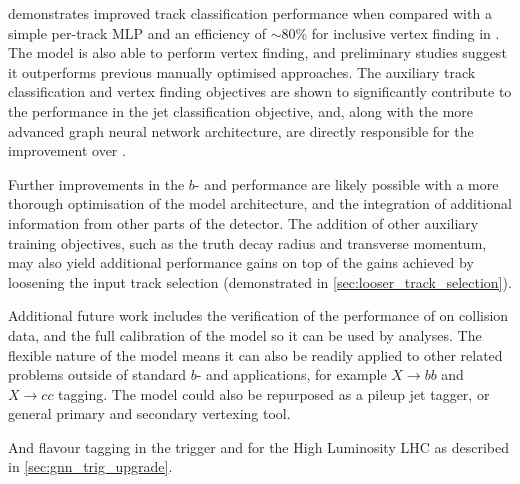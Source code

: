 \GNN demonstrates improved track classification performance when compared with a simple per-track MLP and an efficiency of $\sim80\%$ for inclusive vertex finding in \bjets.
The model is also able to perform vertex finding, and preliminary studies suggest it outperforms previous manually optimised approaches.
The auxiliary track classification and vertex finding objectives are shown to significantly contribute to the performance in the jet classification objective, and, along with the more advanced graph neural network architecture, are directly responsible for the improvement over \DLr.

Further improvements in the $b$- and \ctagging performance are likely possible with a more thorough optimisation of the model architecture, and the integration of additional information from other parts of the \ATLAS detector.
The addition of other auxiliary training objectives, such as the truth \bhadron decay radius and transverse momentum, may also yield additional performance gains on top of the gains achieved by loosening the input track selection (demonstrated in \cref{sec:looser_track_selection}).

Additional future work includes the verification of the performance of \GNN on collision data, and the full calibration of the model so it can be used by analyses.
The flexible nature of the model means it can also be readily applied to other related problems outside of standard $b$- and \ctagging applications, for example $X \rightarrow bb$ and $X \rightarrow cc$ tagging.
The model could also be repurposed as a pileup jet tagger, or general primary and secondary vertexing tool.

And flavour tagging in the trigger and for the High Luminosity LHC as described in \cref{sec:gnn_trig_upgrade}.




